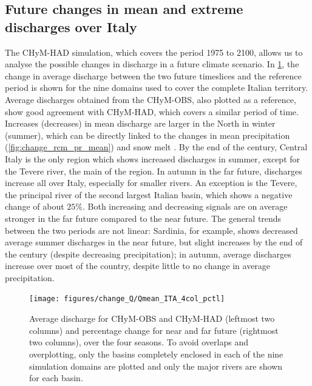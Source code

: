 \subsection{Future changes in mean and extreme discharges over Italy}
The CHyM-HAD simulation, which covers the period 1975 to 2100, allows us to analyse the possible changes in discharge in a future climate scenario.
In \cref{fig:change_qmean_hadgem}, the change in average discharge between the two future timeslices and the reference period is shown for the nine domains used to cover the complete Italian territory.
Average discharges obtained from the CHyM-OBS, also plotted as a reference, show good agreement with CHyM-HAD, which covers a similar period of time.
Increases (decreases) in mean discharge are larger in the North in winter (summer), which can be directly linked to the changes in mean precipitation (\cref{fig:change_rcm_pr_mean}) and snow melt \citep{coppola2014ChahydconPobasundglowar}.
By the end of the century, Central Italy is the only region which shows increased discharges in summer, except for the Tevere river, the main of the region.
In autumn in the far future, discharges increase all over Italy, especially for smaller rivers.
An exception is the Tevere, the principal river of the second largest Italian basin, which shows a negative change of about $25\%$. 
Both increasing and decreasing signals are on average stronger in the far future compared to the near future.
The general trends between the two periods are not linear: Sardinia, for example, shows decreased average summer discharges in the near future, but slight increases by the end of the century (despite decreasing precipitation); in autumn, average discharges increase over most of the country, despite little to no change in average precipitation. 
\begin{figure}
    \centering
    \texttt{[image: figures/change\_Q/Qmean\_ITA\_4col\_pctl]}
    \decoRule
    \caption[Average discharge change in CHyM (HadGEM)]{
        Average discharge for CHyM-OBS and CHyM-HAD (leftmost two columns) and percentage change for near and far future (rightmost two columns), over the four seasons. To avoid overlaps and overplotting, only the basins completely enclosed in each of the nine simulation domains are plotted and only the major rivers are shown for each basin.
    } \label{fig:change_qmean_hadgem}
\end{figure}

